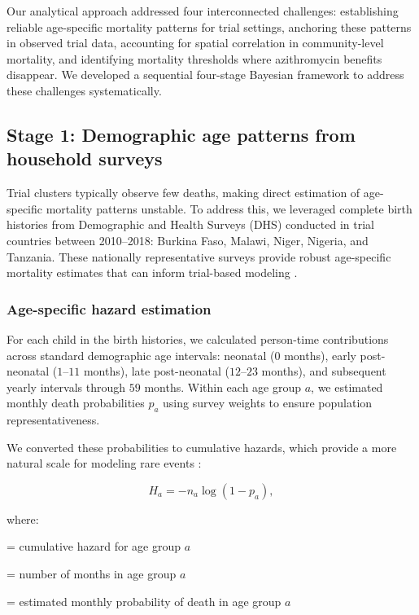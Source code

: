 \documentclass[11pt]{article}\usepackage[]{graphicx}\usepackage[]{xcolor}
\begin{document}
Our analytical approach addressed four interconnected challenges: establishing reliable age-specific mortality patterns for trial settings, anchoring these patterns in observed trial data, accounting for spatial correlation in community-level mortality, and identifying mortality thresholds where azithromycin benefits disappear. We developed a sequential four-stage Bayesian framework to address these challenges systematically.

\subsection{Stage 1: Demographic age patterns from household surveys}

Trial clusters typically observe few deaths, making direct estimation of age-specific mortality patterns unstable. To address this, we leveraged complete birth histories from Demographic and Health Surveys (DHS) conducted in trial countries between 2010--2018: Burkina Faso, Malawi, Niger, Nigeria, and Tanzania. These nationally representative surveys provide robust age-specific mortality estimates that can inform trial-based modeling \citep{mercer2015aoas, wakefield2020insr}.

\subsubsection{Age-specific hazard estimation}

For each child in the birth histories, we calculated person-time contributions across standard demographic age intervals: neonatal ($0$ months), early post-neonatal ($1$--$11$ months), late post-neonatal ($12$--$23$ months), and subsequent yearly intervals through $59$ months. Within each age group $a$, we estimated monthly death probabilities $p_a$ using survey weights to ensure population representativeness. 

We converted these probabilities to cumulative hazards, which provide a more natural scale for modeling rare events \citep{liu2016lancet}:

\begin{equation}
H_a = -n_a \log(1 - p_a),
\end{equation}

\noindent where:
\begin{description}[leftmargin=2em]
\item[$H_a$] = cumulative hazard for age group $a$
\item[$n_a$] = number of months in age group $a$ 
\item[$p_a$] = estimated monthly probability of death in age group $a$
\end{description}
\end{document}
